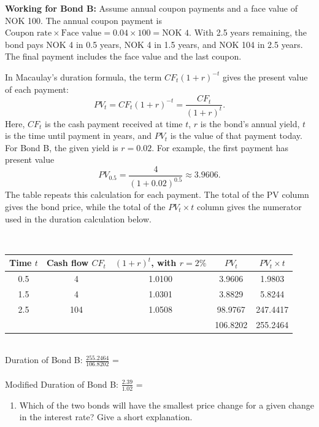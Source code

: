 \documentclass[12]{article}
\begin{document}
\noindent\textbf{Working for Bond B:} Assume annual coupon payments and a face value of NOK 100. The annual coupon payment is $\text{Coupon rate}\times\text{Face value}=0.04\times100=\text{NOK }4$. With 2.5 years remaining, the bond pays NOK 4 in 0.5 years, NOK 4 in 1.5 years, and NOK 104 in 2.5 years. The final payment includes the face value and the last coupon. \par\noindent In Macaulay's duration formula, the term $CF_t(1+r)^{-t}$ gives the present value of each payment: \[PV_t=CF_t(1+r)^{-t}=\frac{CF_t}{(1+r)^t}.\] Here, $CF_t$ is the cash payment received at time $t$, $r$ is the bond's annual yield, $t$ is the time until payment in years, and $PV_t$ is the value of that payment today. For Bond B, the given yield is $r=0.02$. For example, the first payment has present value \[PV_{0.5}=\frac{4}{(1+0.02)^{0.5}}\approx3.9606.\] The table repeats this calculation for each payment. The total of the PV column gives the bond price, while the total of the $PV_t\times t$ column gives the numerator used in the duration calculation below. \par\noindent
\\

\begin{table}[H]
    \centering
    {\color{blue}\begin{tabular}{ccccc}
    \toprule
        Time $t$ & Cash flow $CF_t$ & $(1+r)^t$, with $r=2\%$ & $PV_t$ & $PV_t\times t$\\\midrule
        0.5 & 4 & 1.0100 & 3.9606 & 1.9803\\
        1.5 & 4 & 1.0301 & 3.8829 & 5.8244\\
        2.5 & 104 & 1.0508 & 98.9767 & 247.4417\\\midrule
            &     &        & 106.8202 &255.2464\\ \bottomrule
    \end{tabular}}
    \label{tab:my_label}
\end{table}

\noindent
\\
Duration of Bond B: {\Large $\frac{255.2464}{106.8202}$} = \\
\\
Modified Duration of Bond B: {\Large $\frac{2.39}{1.02}$} = \\






\color{black}
\begin{enumerate}
    \item[b)] Which of the two bonds will have the smallest price change for a given change in the interest rate? Give a short explanation.
\end{enumerate}
\end{document}
